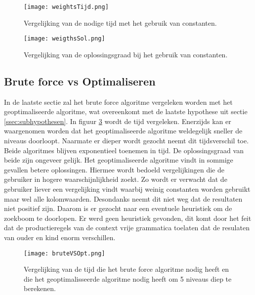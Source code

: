 \documentclass[Main.tex]{subfiles}
\begin{document}
\begin{figure}[!htb]
\centering
\texttt{[image: weightsTijd.png]} 
\caption{Vergelijking van de nodige tijd met het gebruik van constanten.} \label{fig:gewichtenTijd}
\end{figure}

\begin{figure}[!htb]
\centering
\texttt{[image: weigthsSol.png]} 
\caption{Vergelijking van de oplossingsgraad bij het gebruik van constanten.} \label{fig:gewichtenOplossingsgraad}
\end{figure}

\subsection{Brute force vs Optimaliseren}
In de laatste sectie zal het brute force algoritme vergeleken worden met het geoptimaliseerde algoritme, wat overeenkomt met de laatste hypothese uit sectie \ref{ssec:subhypothesen}. In figuur \ref{fig:brutevsopttijd} wordt de tijd vergeleken. Enerzijds kan er waargenomen worden dat het geoptimaliseerde algoritme weldegelijk sneller de niveaus doorloopt. Naarmate er dieper wordt gezocht neemt dit tijdsverschil toe. Beide algoritmes blijven exponentieel toenemen in tijd. De oplossingsgraad van beide zijn ongeveer gelijk. Het geoptimaliseerde algoritme vindt in sommige gevallen betere oplossingen. Hiermee wordt bedoeld vergelijkingen die de gebruiker in hogere waarschijnlijkheid zoekt. Zo wordt er verwacht dat de gebruiker liever een vergelijking vindt waarbij weinig constanten worden gebruikt maar wel alle kolomwaarden. Desondanks neemt dit niet weg dat de resultaten niet positief zijn. Daarom is er gezocht naar een eventuele heuristiek om de zoekboom te doorlopen. Er werd geen heuristiek gevonden, dit komt door het feit dat de productieregels van de context vrije grammatica toelaten dat de resulaten van ouder en kind enorm verschillen.

\begin{figure}[!htb]
\centering
\texttt{[image: bruteVSOpt.png]} 
\caption{Vergelijking van de tijd die het brute force algoritme nodig heeft en die het geoptimalisseerde algoritme nodig heeft om 5 niveaus diep te berekenen.} \label{fig:brutevsopttijd}
\end{figure}
\end{document}
